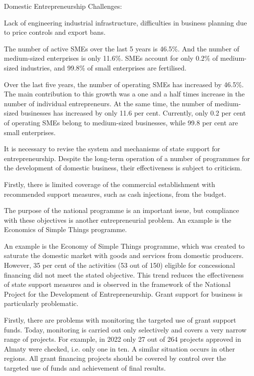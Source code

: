 \begin{multicols}{2}
Domestic Entrepreneurship Challenges:

Lack of engineering industrial infrastructure, difficulties in business
planning due to price controls and export bans.

The number of active SMEs over the last 5 years is 46.5\%. And the
number of medium-sized enterprises is only 11.6\%. SMEs account for only
0.2\% of medium-sized industries, and 99.8\% of small enterprises are
fertilised.

Over the last five years, the number of operating SMEs has increased by
46.5\%. The main contribution to this growth was a one and a half times
increase in the number of individual entrepreneurs. At the same time,
the number of medium-sized businesses has increased by only 11.6 per
cent. Currently, only 0.2 per cent of operating SMEs belong to
medium-sized businesses, while 99.8 per cent are small enterprises.

It is necessary to revise the system and mechanisms of state support for
entrepreneurship. Despite the long-term operation of a number of
programmes for the development of domestic business, their effectiveness
is subject to criticism.

Firstly, there is limited coverage of the commercial establishment with
recommended support measures, such as cash injections, from the budget.

The purpose of the national programme is an important issue, but
compliance with these objectives is another entrepreneurial problem. An
example is the Economics of Simple Things programme.

An example is the Economy of Simple Things programme, which was created
to saturate the domestic market with goods and services from domestic
producers. However, 35 per cent of the activities (53 out of 150)
eligible for concessional financing did not meet the stated objective.
This trend reduces the effectiveness of state support measures and is
observed in the framework of the National Project for the Development of
Entrepreneurship. Grant support for business is particularly
problematic.

Firstly, there are problems with monitoring the targeted use of grant
support funds. Today, monitoring is carried out only selectively and
covers a very narrow range of projects. For example, in 2022 only 27 out
of 264 projects approved in Almaty were checked, i.e. only one in ten. A
similar situation occurs in other regions. All grant financing projects
should be covered by control over the targeted use of funds and
achievement of final results.


\end{multicols}
